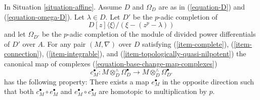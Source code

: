 \begin{lemma}
\label{lemma-computation}
In Situation \ref{situation-affine}. Assume $D$ and $\Omega_D$ are as in
(\ref{equation-D}) and (\ref{equation-omega-D}).
Let $\lambda \in D$. Let $D'$ be the $p$-adic completion of
$$
D[z]\langle \xi \rangle/(\xi - (z^p - \lambda))
$$
and let $\Omega_{D'}$ be the $p$-adic completion of the module of
divided power differentials of $D'$ over $A$. For any pair $(M, \nabla)$
over $D$ satisfying (\ref{item-complete}), (\ref{item-connection}),
(\ref{item-integrable}), and (\ref{item-topologically-quasi-nilpotent})
the canonical map of complexes (\ref{equation-base-change-map-complexes})
$$
c_M^\bullet : M \otimes_D^\wedge \Omega^\bullet_D
\longrightarrow
M \otimes_D^\wedge \Omega^\bullet_{D'}
$$
has the following property: There exists a map $e_M^\bullet$
in the opposite direction such that both $c_M^\bullet \circ e_M^\bullet$
and $e_M^\bullet \circ c_M^\bullet$ are homotopic to multiplication by $p$.
\end{lemma}

